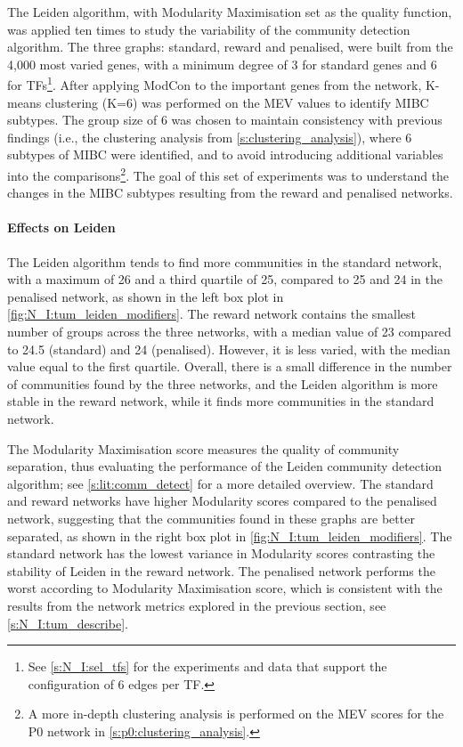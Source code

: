 The Leiden algorithm, with Modularity Maximisation set as the quality function, was applied ten times to study the variability of the community detection algorithm. The three graphs: standard, reward and penalised, were built from the 4,000 most varied genes, with a minimum degree of 3 for standard genes and 6 for TFs\footnote{See \cref{s:N_I:sel_tfs} for the experiments and data that support the configuration of 6 edges per TF.}. After applying ModCon to the important genes from the network, K-means clustering (K=6) was performed on the MEV values to identify MIBC subtypes. The group size of 6 was chosen to maintain consistency with previous findings (i.e., the clustering analysis from \cref{s:clustering_analysis}), where 6 subtypes of MIBC were identified, and to avoid introducing additional variables into the comparisons\footnote{A more in-depth clustering analysis is performed on the MEV scores for the P0 network in \cref{s:p0:clustering_analysis}.}. The goal of this set of experiments was to understand the changes in the MIBC subtypes resulting from the reward and penalised networks.


\paragraph*{Effects on Leiden}
The Leiden algorithm tends to find more communities in the standard network, with a maximum of 26 and a third quartile of 25, compared to 25 and 24 in the penalised network, as shown in the left box plot in \cref{fig:N_I:tum_leiden_modifiers}. The reward network contains the smallest number of groups across the three networks, with a median value of 23 compared to 24.5 (standard) and 24 (penalised). However, it is less varied, with the median value equal to the first quartile. Overall, there is a small difference in the number of communities found by the three networks, and the Leiden algorithm is more stable in the reward network, while it finds more communities in the standard network.

The Modularity Maximisation score measures the quality of community separation, thus evaluating the performance of the Leiden community detection algorithm; see \cref{s:lit:comm_detect} for a more detailed overview. The standard and reward networks have higher Modularity scores compared to the penalised network, suggesting that the communities found in these graphs are better separated, as shown in the right box plot in \cref{fig:N_I:tum_leiden_modifiers}. The standard network has the lowest variance in Modularity scores contrasting the stability of Leiden in the reward network. The penalised network performs the worst according to Modularity Maximisation score, which is consistent with the results from the network metrics explored in the previous section, see \cref{s:N_I:tum_describe}.

